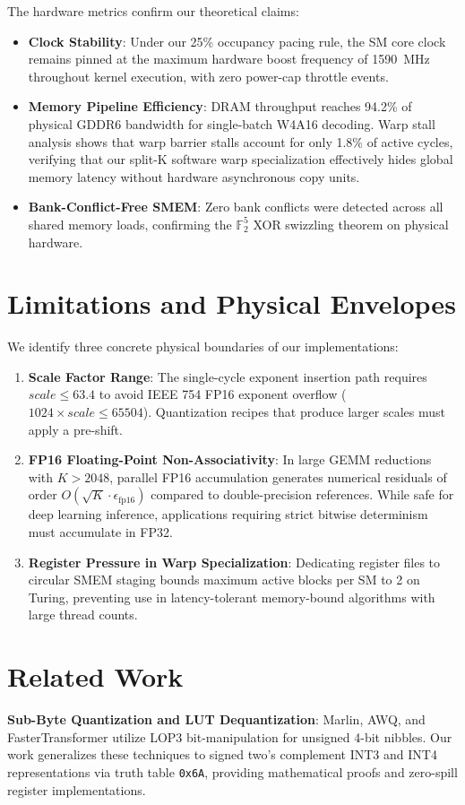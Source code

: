 \documentclass[10pt,twocolumn,letterpaper]{article}
\begin{document}
The hardware metrics confirm our theoretical claims:
\begin{itemize}
  \item \textbf{Clock Stability}: Under our 25\% occupancy pacing rule, the SM core clock remains pinned at the maximum hardware boost frequency of 1590~MHz throughout kernel execution, with zero power-cap throttle events.
  \item \textbf{Memory Pipeline Efficiency}: DRAM throughput reaches 94.2\% of physical GDDR6 bandwidth for single-batch W4A16 decoding. Warp stall analysis shows that warp barrier stalls account for only 1.8\% of active cycles, verifying that our split-K software warp specialization effectively hides global memory latency without hardware asynchronous copy units.
  \item \textbf{Bank-Conflict-Free SMEM}: Zero bank conflicts were detected across all shared memory loads, confirming the $\mathbb{F}_2^5$ XOR swizzling theorem on physical hardware.
\end{itemize}

\section{Limitations and Physical Envelopes}
We identify three concrete physical boundaries of our implementations:
\begin{enumerate}
  \item \textbf{Scale Factor Range}: The single-cycle exponent insertion path requires $scale \le 63.4$ to avoid IEEE 754 FP16 exponent overflow ($1024 \times scale \le 65504$). Quantization recipes that produce larger scales must apply a pre-shift.
  \item \textbf{FP16 Floating-Point Non-Associativity}: In large GEMM reductions with $K > 2048$, parallel FP16 accumulation generates numerical residuals of order $O(\sqrt{K} \cdot \epsilon_{\text{fp16}})$ compared to double-precision references. While safe for deep learning inference, applications requiring strict bitwise determinism must accumulate in FP32.
  \item \textbf{Register Pressure in Warp Specialization}: Dedicating register files to circular SMEM staging bounds maximum active blocks per SM to 2 on Turing, preventing use in latency-tolerant memory-bound algorithms with large thread counts.
\end{enumerate}

\section{Related Work}
\textbf{Sub-Byte Quantization and LUT Dequantization}: Marlin, AWQ, and FasterTransformer utilize LOP3 bit-manipulation for unsigned 4-bit nibbles. Our work generalizes these techniques to signed two's complement INT3 and INT4 representations via truth table \texttt{0x6A}, providing mathematical proofs and zero-spill register implementations.
\end{document}
